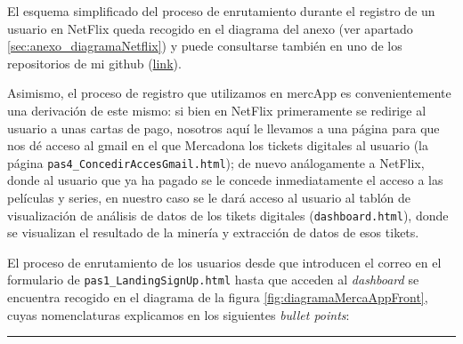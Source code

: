 \documentclass[a4paper,12pt]{report}
\begin{document}
	El esquema simplificado del proceso de enrutamiento durante el registro de un usuario en NetFlix queda recogido en el diagrama del anexo (ver apartado \ref{sec:anexo_diagramaNetflix}) y puede consultarse también en uno de los repositorios de mi github (\href{https://www.github.com/miApp}{link}). 
	
	Asimismo, el proceso de registro que utilizamos en mercApp es convenientemente una derivación de este mismo: si bien en NetFlix primeramente se redirige al usuario a unas cartas de pago, nosotros aquí le llevamos a una página para que nos dé acceso al gmail en el que Mercadona los tickets digitales al usuario (la página  \texttt{pas4\_ConcedirAccesGmail.html}); de nuevo análogamente a NetFlix, donde al usuario que ya ha pagado se le concede inmediatamente el acceso a las películas y series,  en nuestro caso se le dará acceso al usuario al tablón de visualización de análisis de datos de los tikets digitales  (\texttt{dashboard.html}), donde se visualizan el resultado de la minería y extracción de datos de esos tikets. 
	
	El proceso de enrutamiento de los usuarios desde que introducen el correo en el formulario de \texttt{pas1\_LandingSignUp.html} hasta que acceden al \textit{dashboard} se encuentra recogido en el diagrama de la figura \ref{fig:diagramaMercaAppFront}, cuyas nomenclaturas explicamos en los siguientes \textit{bullet points}:
	\vspace{1em}
	\hrule
	
\end{document}
